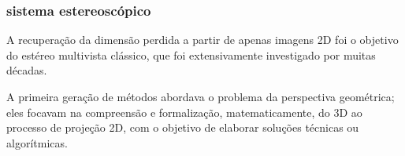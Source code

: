 \begin{frame}
  \frametitle{sistema estereoscópico}
A recuperação da dimensão perdida a partir de apenas imagens 2D foi o objetivo
do estéreo multivista clássico, que foi extensivamente investigado por
muitas décadas.

A primeira geração de métodos abordava o problema da perspectiva geométrica;
eles focavam na compreensão e formalização, matematicamente, do 3D ao
processo de projeção 2D, com o objetivo de elaborar soluções técnicas ou
algorítmicas.

\end{frame}
